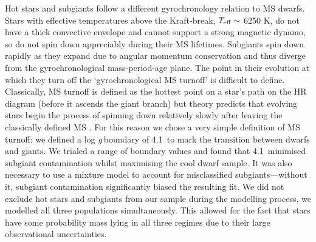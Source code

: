 \documentclass[11pt,preprint]{aastex}
\newcommand{\logg}{log \emph{g}}
\newcommand{\subcut}{4.1~}
\begin{document}
Hot stars and subgiants follow a different gyrochronology relation to MS
dwarfs.
Stars with effective temperatures above the Kraft-break, $T_{\rm{eff}}
\sim$ 6250 K, \citep{Kraft1967} do not have a thick convective envelope and
cannot support a strong magnetic dynamo, so do not spin down appreciably
during their MS lifetimes.
Subgiants spin down rapidly as they expand due to angular momentum
conservation and thus diverge from the gyrochronological mass-period-age
plane.
The point in their evolution at which they turn off the `gyrochronological MS
turnoff' is difficult to define.
Classically, MS turnoff is defined as the hottest point on a star's path on
the HR diagram (before it ascends the giant branch) but theory predicts that
evolving stars begin the process of spinning down relatively slowly after
leaving the classically defined MS \citep{vanSaders2013}.
For this reason we chose a very simple definition of MS turnoff: we defined
a \logg$~$boundary of \subcut to mark the transition between dwarfs and
giants.
We trialed a range of boundary values and found that \subcut minimised subgiant
contamination whilst maximising the cool dwarf sample.
It was also necessary to use a mixture model to account for misclassified
subgiants---without it, subgiant contamination significantly biased the
resulting fit.
We did not exclude hot stars and subgiants from our sample during the
modelling process, we modelled all three populations simultaneously.
This allowed for the fact that stars have some probability mass lying in all
three regimes due to their large observational uncertainties.
\end{document}
